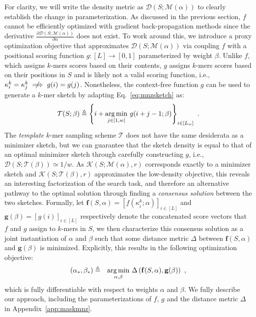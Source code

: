 \noindent For clarity, we will write the density metric as $\mathcal{D}(S; \mathcal{M}(\alpha))$ to clearly establish the change in parameterization. As discussed in the previous section, $f$ cannot be efficiently optimized with gradient back-propagation methods since the derivative $\frac{\partial\mathcal{D}(S; \mathcal{M}(\alpha))}{\partial\alpha}$ does not exist. To work around this, we introduce a proxy optimization objective that approximates $\mathcal{D}(S; \mathcal{M}(\alpha))$ via coupling $f$ with a positional scoring function $g: [L] \rightarrow [0,1]$ parameterized by weight $\beta$. Unlike $f$, which assigns $k$-mers scores based on their contents, $g$ assigns $k$-mers scores based on their positions in $S$ and is likely not a valid scoring function, i.e., $\kappa^k_i = \kappa^k_j \centernot\implies g(i) = g(j)$. Nonetheless, the context-free function $g$ can be used to generate a $k$-mer sketch by adapting Eq.~\ref{eq:mnzsketch} as:
\begin{eqnarray}
\mathcal{T}(S; \beta) \triangleq \left\{i + \underset{j\in[1,w]}{\argmin} \ g(i+j-1; \beta)\right\}_{i \in [L_w]} \ .
\end{eqnarray}
The \emph{template} $k$-mer sampling scheme $\mathcal{T}$ does not have the same desiderata as a minimizer sketch, but we can guarantee that the sketch density is equal to that of an optimal minimizer sketch through carefully constructing $g$, i.e., $\mathcal{D}(S; \mathcal{T}(\beta)) \simeq 1/w$. As $\mathcal{K}(S; \mathcal{M}(\alpha), r)$ corresponds exactly to a minimizer sketch and $\mathcal{K}(S; \mathcal{T}(\beta), r)$ approximates the low-density objective, this reveals an interesting factorization of the search task, and therefore an alternative pathway to the optimal solution through finding a \emph{consensus solution} between the two sketches. Formally, let $\mathbf{f}(S,\alpha) = [f(\kappa^k_i;\alpha)]_{i\in[L]}$ and $\mathbf{g}(\beta) = [g(i)]_{i\in[L]}$ respectively denote the concatenated score vectors that $f$ and $g$ assign to $k$-mers in $S$, we then characterize this consensus solution as a joint instantiation of $\alpha$ and $\beta$ such that some distance metric $\Delta$ between $\mathbf{f}(S,\alpha)$ and $\mathbf{g}(\beta)$ is minimized. Explicitly, this results in the following optimization objective:
\begin{eqnarray}
(\alpha_\ast,\beta_\ast) &\triangleq& \underset{\alpha, \beta}{\argmin} \ \Delta\left(\mathbf{f}(S,\alpha),\mathbf{g}(\beta)\right) \ ,
\end{eqnarray}
which is fully differentiable with respect to weights $\alpha$ and $\beta$. We fully describe our approach, including the parameterizations of $f$, $g$ and the distance metric $\Delta$ in Appendix~\ref{app:maskmnz}.
